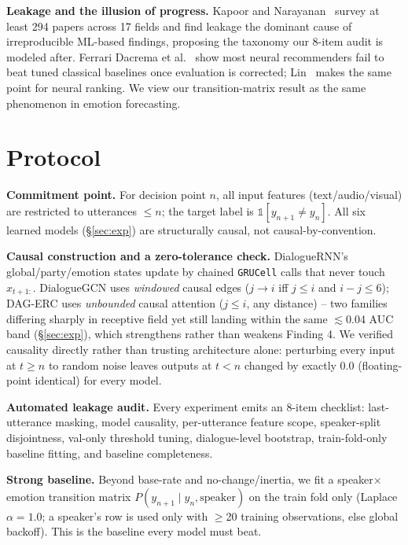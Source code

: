 \documentclass[conference]{IEEEtran}
\begin{document}
\textbf{Leakage and the illusion of progress.} Kapoor and Narayanan~\cite{kapoor2023leakage} survey
at least 294 papers across 17 fields and find leakage the dominant cause of irreproducible
ML-based findings, proposing the taxonomy our 8-item audit is modeled after. Ferrari Dacrema et
al.~\cite{dacrema2019recsys} show most neural recommenders fail to beat tuned classical baselines
once evaluation is corrected; Lin~\cite{lin2019neuralhype} makes the same point for neural ranking.
We view our transition-matrix result as the same phenomenon in emotion forecasting.

\section{Protocol}

\textbf{Commitment point.} For decision point $n$, all input features (text/audio/visual) are
restricted to utterances $\leq n$; the target label is $\mathbb{1}[y_{n+1} \neq y_n]$. All six
learned models (\S\ref{sec:exp}) are structurally causal, not causal-by-convention.

\textbf{Causal construction and a zero-tolerance check.} DialogueRNN's global/party/emotion states
update by chained \texttt{GRUCell} calls that never touch $x_{t+1:}$. DialogueGCN uses
\emph{windowed} causal edges ($j{\to}i$ iff $j\leq i$ and $i-j\leq 6$); DAG-ERC uses
\emph{unbounded} causal attention ($j\leq i$, any distance) -- two families differing sharply in
receptive field yet still landing within the same $\lesssim$0.04 AUC band (\S\ref{sec:exp}), which
strengthens rather than weakens Finding 4. We verified causality directly rather than trusting
architecture alone: perturbing every input at $t\geq n$ to random noise leaves outputs at $t<n$
changed by exactly 0.0 (floating-point identical) for every model.

\textbf{Automated leakage audit.} Every experiment emits an 8-item checklist: last-utterance
masking, model causality, per-utterance feature scope, speaker-split disjointness, val-only threshold
tuning, dialogue-level bootstrap, train-fold-only baseline fitting, and baseline completeness.

\textbf{Strong baseline.} Beyond base-rate and no-change/inertia, we fit a
speaker$\times$emotion transition matrix $P(y_{n+1} \mid y_n, \text{speaker})$ on the train fold
only (Laplace $\alpha{=}1.0$; a speaker's row is used only with $\geq$20 training observations,
else global backoff). This is the baseline every model must beat.
\end{document}
